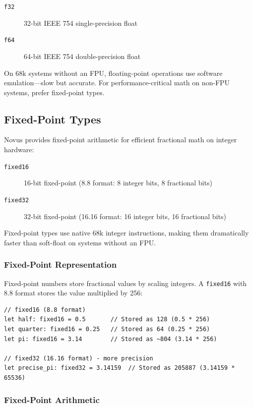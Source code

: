 \begin{description}
    \item[\texttt{f32}] 32-bit IEEE 754 single-precision float
    \item[\texttt{f64}] 64-bit IEEE 754 double-precision float
\end{description}

On 68k systems without an FPU, floating-point operations use software emulation---slow but accurate. For performance-critical math on non-FPU systems, prefer fixed-point types.

\subsection{Fixed-Point Types}

Novus provides fixed-point arithmetic for efficient fractional math on integer hardware:

\begin{description}
    \item[\texttt{fixed16}] 16-bit fixed-point (8.8 format: 8 integer bits, 8 fractional bits)
    \item[\texttt{fixed32}] 32-bit fixed-point (16.16 format: 16 integer bits, 16 fractional bits)
\end{description}

Fixed-point types use native 68k integer instructions, making them dramatically faster than soft-float on systems without an FPU.

\subsubsection{Fixed-Point Representation}

Fixed-point numbers store fractional values by scaling integers. A \texttt{fixed16} with 8.8 format stores the value multiplied by 256:

\begin{lstlisting}
// fixed16 (8.8 format)
let half: fixed16 = 0.5       // Stored as 128 (0.5 * 256)
let quarter: fixed16 = 0.25   // Stored as 64 (0.25 * 256)
let pi: fixed16 = 3.14        // Stored as ~804 (3.14 * 256)

// fixed32 (16.16 format) - more precision
let precise_pi: fixed32 = 3.14159  // Stored as 205887 (3.14159 * 65536)
\end{lstlisting}

\subsubsection{Fixed-Point Arithmetic}

